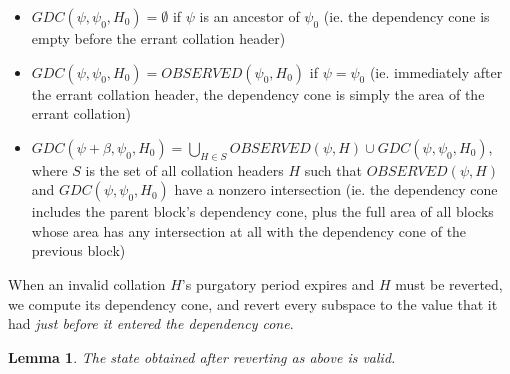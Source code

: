 \documentclass[11pt,a4paper]{article}
\theoremstyle{plain}
\newtheorem{lem}[thm]{Lemma}
\theoremstyle{definition}
\theoremstyle{remark}
\begin{document}
\begin{itemize}
\item
$GDC(\psi, \psi_0, H_0) = \emptyset$ if $\psi$ is an ancestor of $\psi_0$ (ie. the dependency cone is empty before the errant collation header)
\item
$GDC(\psi, \psi_0, H_0) = OBSERVED(\psi_0, H_0)$ if $\psi = \psi_0$ (ie. immediately after the errant collation header, the dependency cone is simply the area of the errant collation)
\item
$GDC(\psi + \beta, \psi_0, H_0) = \bigcup_{H \in S} OBSERVED(\psi, H) \cup GDC(\psi, \psi_0, H_0)$, where $S$ is the set of all collation headers $H$ such that $OBSERVED(\psi, H)$ and $GDC(\psi, \psi_0, H_0)$ have a nonzero intersection (ie. the dependency cone includes the parent block's dependency cone, plus the full area of all blocks whose area has any intersection at all with the dependency cone of the previous block)
\end{itemize}

When an invalid collation $H$'s purgatory period expires and $H$ must be reverted, we compute its dependency cone, and revert every subspace to the value that it had \emph{just before it entered the dependency cone}.

\begin{lem}
The state obtained after reverting as above is valid.
\end{lem}
\end{document}
